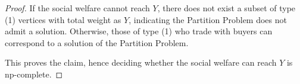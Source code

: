 \documentclass{aamas2015}
\newtheorem{definition}{Definition}
\begin{document}
\begin{proof}
	If the social welfare cannot reach $Y$, there does not exist a subset of type (1) vertices with total weight as $Y$, indicating the {\sc Partition Problem} does not admit a solution.
	Otherwise, those of type (1) who trade with buyers can correspond to a solution of the {\sc Partition Problem}.
	
	This proves the claim, hence deciding whether the social welfare can reach $Y$ is {\sc np-complete}.
\end{proof}

%
%
%
\end{document}
